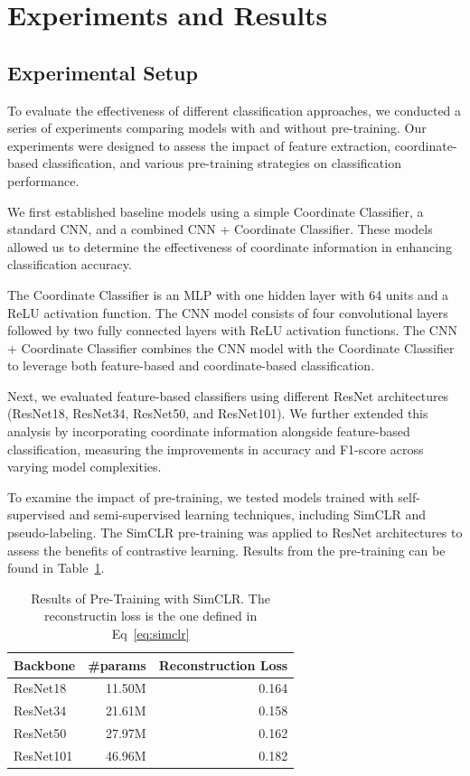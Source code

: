 \documentclass{article}
\begin{document}
\section{Experiments and Results}

\subsection{Experimental Setup}

To evaluate the effectiveness of different classification approaches, we
conducted a series of experiments comparing models with and without
pre-training. Our experiments were designed to assess the impact of feature
extraction, coordinate-based classification, and various pre-training
strategies on classification performance.

We first established baseline models using a simple Coordinate Classifier, a
standard CNN, and a combined CNN + Coordinate Classifier. These models allowed
us to determine the effectiveness of coordinate information in enhancing
classification accuracy.

The Coordinate Classifier is an MLP with one hidden layer with 64 units and a
ReLU activation function. The CNN model consists of four convolutional layers
followed by two fully connected layers with ReLU activation functions. The CNN
+ Coordinate Classifier combines the CNN model with the Coordinate Classifier
to leverage both feature-based and coordinate-based classification.

Next, we evaluated feature-based classifiers using different ResNet
architectures (ResNet18, ResNet34, ResNet50, and ResNet101). We further
extended this analysis by incorporating coordinate information alongside
feature-based classification, measuring the improvements in accuracy and
F1-score across varying model complexities.

To examine the impact of pre-training, we tested models trained with
self-supervised and semi-supervised learning techniques, including SimCLR and
pseudo-labeling. The SimCLR pre-training was applied to ResNet architectures to
assess the benefits of contrastive learning. Results from the pre-training can
be found in Table~\ref{tab:simclr}.

\begin{table}[!htp]\centering
  \caption{Results of Pre-Training with SimCLR. The reconstructin loss is the one defined in Eq~\ref{eq:simclr}}\label{tab:simclr}
  \scriptsize
  \begin{tabular}{lrr}\toprule
    \textbf{Backbone} & \textbf{\#params} & \textbf{Reconstruction Loss} \\\midrule
    ResNet18          & 11.50M            & 0.164                        \\
    ResNet34          & 21.61M            & 0.158                        \\
    ResNet50          & 27.97M            & 0.162                        \\
    ResNet101         & 46.96M            & 0.182                        \\
    \bottomrule
  \end{tabular}
\end{table}
\end{document}
